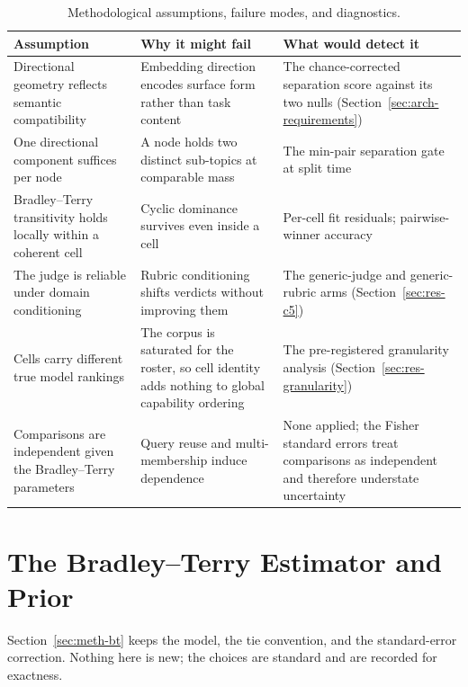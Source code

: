 \begin{table}[htbp]
    \centering
    \caption{Methodological assumptions, failure modes, and diagnostics.}
    \label{tab:meth-assumptions}
    \begin{tabular}{p{3.4cm}p{4.4cm}p{4.4cm}}
        \toprule
        Assumption & Why it might fail & What would detect it \\
        \midrule
        Directional geometry reflects semantic compatibility
        & Embedding direction encodes surface form rather than task
        content
        & The chance-corrected separation score against its two nulls
        (Section~\ref{sec:arch-requirements}) \\
        \addlinespace
        One directional component suffices per node
        & A node holds two distinct sub-topics at comparable mass
        & The min-pair separation gate at split time \\
        \addlinespace
        Bradley--Terry transitivity holds locally within a coherent cell
        & Cyclic dominance survives even inside a cell
        & Per-cell fit residuals; pairwise-winner accuracy \\
        \addlinespace
        The judge is reliable under domain conditioning
        & Rubric conditioning shifts verdicts without improving them
        & The generic-judge and generic-rubric arms
        (Section~\ref{sec:res-c5}) \\
        \addlinespace
        Cells carry different true model rankings
        & The corpus is saturated for the roster, so cell identity adds
        nothing to global capability ordering
        & The pre-registered granularity analysis
        (Section~\ref{sec:res-granularity}) \\
        \addlinespace
        Comparisons are independent given the Bradley--Terry parameters
        & Query reuse and multi-membership induce dependence
        & None applied; the Fisher standard errors treat comparisons as
        independent and therefore understate uncertainty \\
        \bottomrule
    \end{tabular}
\end{table}

\section{The Bradley--Terry Estimator and Prior}\label{sec:num-bt-estimator}

Section~\ref{sec:meth-bt} keeps the model, the tie convention, and
the standard-error correction. Nothing here is new; the choices are
standard and are recorded for exactness.

